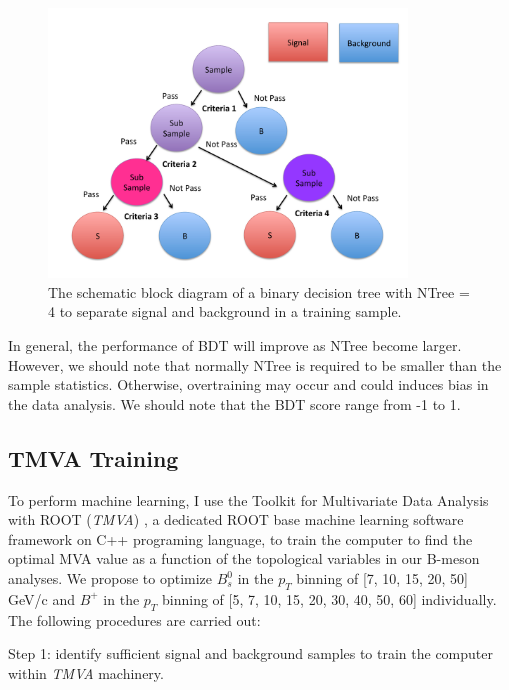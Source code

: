 \begin{figure}[h]
\begin{center}
\includegraphics[width= 0.85\textwidth]{Figures/Chapter4/DecisionTree.pdf}
\caption{The schematic block diagram of a binary decision tree with NTree = 4 to separate signal and background in a training sample.}
\label{DecisionTree}
\end{center}
\end{figure}

In general, the performance of BDT will improve as NTree become larger. However, we should note that normally NTree is required to be smaller than the sample statistics. Otherwise, overtraining may occur and could induces bias in the data analysis. We should note that the BDT score range from -1 to 1. 



\subsection{TMVA Training}


To perform machine learning, I use the Toolkit for Multivariate Data Analysis with ROOT (\textit{TMVA}) \cite{TMVA}, a dedicated ROOT base machine learning software framework on C++ programing language, to train the computer to find the optimal MVA value as a function of the topological variables in our B-meson analyses. We propose to optimize $B^0_s$ in the $p_T$ binning of [7, 10, 15, 20, 50] GeV/c and $B^+$ in the $p_T$ binning of [5, 7, 10, 15, 20, 30, 40, 50, 60] individually. The following procedures are carried out:

Step 1: identify sufficient signal and background samples to train the computer within \textit{TMVA} machinery. 

